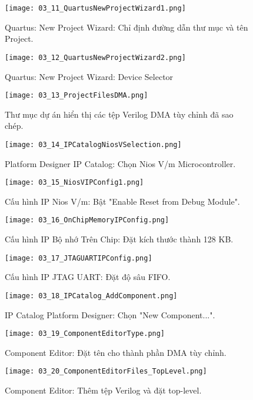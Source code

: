 \begin{figure}[htbp] \centering \texttt{[image: 03\_11\_QuartusNewProjectWizard1.png]} \caption{Quartus: New Project Wizard: Chỉ định đường dẫn thư mục và tên Project.} \label{fig:03_11} \end{figure}
\begin{figure}[htbp] \centering \texttt{[image: 03\_12\_QuartusNewProjectWizard2.png]} \caption{Quartus: New Project Wizard: Device Selector} \label{fig:03_12} \end{figure}
\begin{figure}[htbp] \centering \texttt{[image: 03\_13\_ProjectFilesDMA.png]} \caption{Thư mục dự án hiển thị các tệp Verilog DMA tùy chỉnh đã sao chép.} \label{fig:03_13} \end{figure}
\begin{figure}[htbp] \centering \texttt{[image: 03\_14\_IPCatalogNiosVSelection.png]} \caption{Platform Designer IP Catalog: Chọn Nios V/m Microcontroller.} \label{fig:03_14} \end{figure}
\begin{figure}[htbp] \centering \texttt{[image: 03\_15\_NiosVIPConfig1.png]} \caption{Cấu hình IP Nios V/m: Bật "Enable Reset from Debug Module".} \label{fig:03_15} \end{figure}
\begin{figure}[htbp] \centering \texttt{[image: 03\_16\_OnChipMemoryIPConfig.png]} \caption{Cấu hình IP Bộ nhớ Trên Chip: Đặt kích thước thành 128 KB.} \label{fig:03_16} \end{figure}
\begin{figure}[htbp] \centering \texttt{[image: 03\_17\_JTAGUARTIPConfig.png]} \caption{Cấu hình IP JTAG UART: Đặt độ sâu FIFO.} \label{fig:03_17} \end{figure}
\begin{figure}[htbp] \centering \texttt{[image: 03\_18\_IPCatalog\_AddComponent.png]} \caption{IP Catalog Platform Designer: Chọn "New Component...".} \label{fig:03_18} \end{figure}
\begin{figure}[htbp] \centering \texttt{[image: 03\_19\_ComponentEditorType.png]} \caption{Component Editor: Đặt tên cho thành phần DMA tùy chỉnh.} \label{fig:03_19} \end{figure}
\begin{figure}[htbp] \centering \texttt{[image: 03\_20\_ComponentEditorFiles\_TopLevel.png]} \caption{Component Editor: Thêm tệp Verilog và đặt top-level.} \label{fig:03_20} \end{figure}
